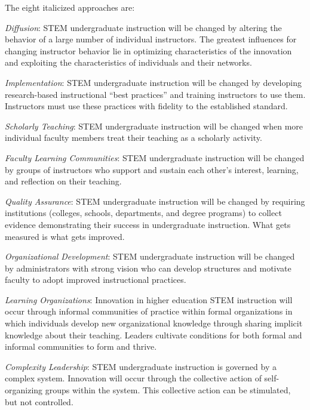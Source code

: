 The eight italicized approaches are:

\begin{gitemize}

\item
  \emph{Diffusion}: STEM undergraduate instruction will be changed by
  altering the behavior of a large number of individual
  instructors. The greatest influences for changing instructor
  behavior lie in optimizing characteristics of the innovation and
  exploiting the characteristics of individuals and their networks.

\item
  \emph{Implementation}: STEM undergraduate instruction will be
  changed by developing research-based instructional ``best
  practices'' and training instructors to use them. Instructors must
  use these practices with fidelity to the established standard.

\item
  \emph{Scholarly Teaching}: STEM undergraduate instruction will be
  changed when more individual faculty members treat their teaching as
  a scholarly activity.

\item
  \emph{Faculty Learning Communities}: STEM undergraduate instruction
  will be changed by groups of instructors who support and sustain
  each other's interest, learning, and reflection on their teaching.

\item
  \emph{Quality Assurance}: STEM undergraduate instruction will be
  changed by requiring institutions (colleges, schools, departments,
  and degree programs) to collect evidence demonstrating their success
  in undergraduate instruction. What gets measured is what gets
  improved.

\item
  \emph{Organizational Development}: STEM undergraduate instruction
  will be changed by administrators with strong vision who can develop
  structures and motivate faculty to adopt improved instructional
  practices.

\item
  \emph{Learning Organizations}: Innovation in higher education STEM
  instruction will occur through informal communities of practice
  within formal organizations in which individuals develop new
  organizational knowledge through sharing implicit knowledge about
  their teaching.  Leaders cultivate conditions for both formal and
  informal communities to form and thrive.

\item
  \emph{Complexity Leadership}: STEM undergraduate instruction is
  governed by a complex system. Innovation will occur through the
  collective action of self-organizing groups within the system. This
  collective action can be stimulated, but not controlled.

\end{gitemize}

